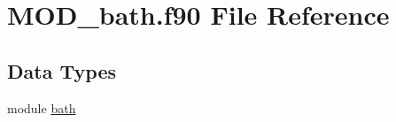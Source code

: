 \hypertarget{MOD__bath_8f90}{\section{M\-O\-D\-\_\-bath.\-f90 File Reference}
\label{MOD__bath_8f90}
}
\subsection*{Data Types}
\begin{DoxyCompactItemize}
\item 
module \hyperlink{classbath}{bath}
\end{DoxyCompactItemize}
